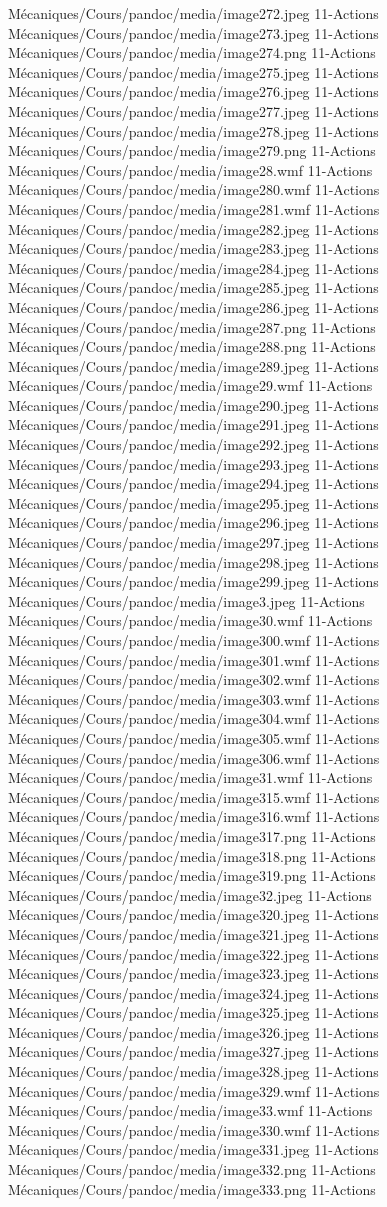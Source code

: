 Mécaniques/Cours/pandoc/media/image272.jpeg 11-Actions Mécaniques/Cours/pandoc/media/image273.jpeg 11-Actions Mécaniques/Cours/pandoc/media/image274.png 11-Actions Mécaniques/Cours/pandoc/media/image275.jpeg 11-Actions Mécaniques/Cours/pandoc/media/image276.jpeg 11-Actions Mécaniques/Cours/pandoc/media/image277.jpeg 11-Actions Mécaniques/Cours/pandoc/media/image278.jpeg 11-Actions Mécaniques/Cours/pandoc/media/image279.png 11-Actions Mécaniques/Cours/pandoc/media/image28.wmf 11-Actions Mécaniques/Cours/pandoc/media/image280.wmf 11-Actions Mécaniques/Cours/pandoc/media/image281.wmf 11-Actions Mécaniques/Cours/pandoc/media/image282.jpeg 11-Actions Mécaniques/Cours/pandoc/media/image283.jpeg 11-Actions Mécaniques/Cours/pandoc/media/image284.jpeg 11-Actions Mécaniques/Cours/pandoc/media/image285.jpeg 11-Actions Mécaniques/Cours/pandoc/media/image286.jpeg 11-Actions Mécaniques/Cours/pandoc/media/image287.png 11-Actions Mécaniques/Cours/pandoc/media/image288.png 11-Actions Mécaniques/Cours/pandoc/media/image289.jpeg 11-Actions Mécaniques/Cours/pandoc/media/image29.wmf 11-Actions Mécaniques/Cours/pandoc/media/image290.jpeg 11-Actions Mécaniques/Cours/pandoc/media/image291.jpeg 11-Actions Mécaniques/Cours/pandoc/media/image292.jpeg 11-Actions Mécaniques/Cours/pandoc/media/image293.jpeg 11-Actions Mécaniques/Cours/pandoc/media/image294.jpeg 11-Actions Mécaniques/Cours/pandoc/media/image295.jpeg 11-Actions Mécaniques/Cours/pandoc/media/image296.jpeg 11-Actions Mécaniques/Cours/pandoc/media/image297.jpeg 11-Actions Mécaniques/Cours/pandoc/media/image298.jpeg 11-Actions Mécaniques/Cours/pandoc/media/image299.jpeg 11-Actions Mécaniques/Cours/pandoc/media/image3.jpeg 11-Actions Mécaniques/Cours/pandoc/media/image30.wmf 11-Actions Mécaniques/Cours/pandoc/media/image300.wmf 11-Actions Mécaniques/Cours/pandoc/media/image301.wmf 11-Actions Mécaniques/Cours/pandoc/media/image302.wmf 11-Actions Mécaniques/Cours/pandoc/media/image303.wmf 11-Actions Mécaniques/Cours/pandoc/media/image304.wmf 11-Actions Mécaniques/Cours/pandoc/media/image305.wmf 11-Actions Mécaniques/Cours/pandoc/media/image306.wmf 11-Actions Mécaniques/Cours/pandoc/media/image31.wmf 11-Actions Mécaniques/Cours/pandoc/media/image315.wmf 11-Actions Mécaniques/Cours/pandoc/media/image316.wmf 11-Actions Mécaniques/Cours/pandoc/media/image317.png 11-Actions Mécaniques/Cours/pandoc/media/image318.png 11-Actions Mécaniques/Cours/pandoc/media/image319.png 11-Actions Mécaniques/Cours/pandoc/media/image32.jpeg 11-Actions Mécaniques/Cours/pandoc/media/image320.jpeg 11-Actions Mécaniques/Cours/pandoc/media/image321.jpeg 11-Actions Mécaniques/Cours/pandoc/media/image322.jpeg 11-Actions Mécaniques/Cours/pandoc/media/image323.jpeg 11-Actions Mécaniques/Cours/pandoc/media/image324.jpeg 11-Actions Mécaniques/Cours/pandoc/media/image325.jpeg 11-Actions Mécaniques/Cours/pandoc/media/image326.jpeg 11-Actions Mécaniques/Cours/pandoc/media/image327.jpeg 11-Actions Mécaniques/Cours/pandoc/media/image328.jpeg 11-Actions Mécaniques/Cours/pandoc/media/image329.wmf 11-Actions Mécaniques/Cours/pandoc/media/image33.wmf 11-Actions Mécaniques/Cours/pandoc/media/image330.wmf 11-Actions Mécaniques/Cours/pandoc/media/image331.jpeg 11-Actions Mécaniques/Cours/pandoc/media/image332.png 11-Actions Mécaniques/Cours/pandoc/media/image333.png 11-Actions 